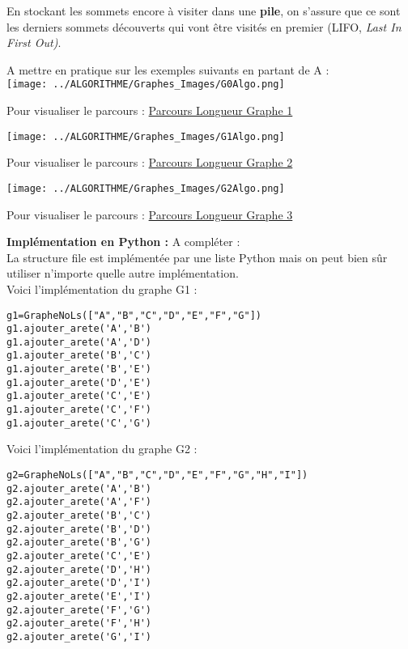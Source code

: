 \documentclass[12pt]{book}
\begin{document}
En stockant les sommets encore à visiter dans une \textbf{pile}, on s'assure que ce sont les derniers sommets découverts qui vont être visités en premier (LIFO, \emph{Last In First Out)}.


\Quest A mettre en pratique sur les exemples suivants en partant de A : \\



\texttt{[image: ../ALGORITHME/Graphes\_Images/G0Algo.png]} 

Pour visualiser le parcours : \href{http://graphonline.ru/fr/home?graph=lrKWNaYUXjRDAwGcZZcst}{Parcours Longueur Graphe 1}



\texttt{[image: ../ALGORITHME/Graphes\_Images/G1Algo.png]} 

Pour visualiser le parcours : \href{http://graphonline.ru/fr/home?graph=iDTFdMBwUVWDnJBhZZcst}{Parcours Longueur Graphe 2}

\texttt{[image: ../ALGORITHME/Graphes\_Images/G2Algo.png]} 

Pour visualiser le parcours : \href{http://graphonline.ru/fr/home?graph=ppLAPymkbRymvVrCZZcst}{Parcours Longueur Graphe 3}

\Quest \textbf{Implémentation en Python : } A compléter :\\
La structure file est implémentée par une liste Python mais on peut bien sûr utiliser n'importe quelle autre implémentation.\\

Voici l'implémentation du graphe G1 : 
\begin{lstlisting}
g1=GrapheNoLs(["A","B","C","D","E","F","G"])
g1.ajouter_arete('A','B')
g1.ajouter_arete('A','D')
g1.ajouter_arete('B','C')
g1.ajouter_arete('B','E')
g1.ajouter_arete('D','E')
g1.ajouter_arete('C','E')
g1.ajouter_arete('C','F')
g1.ajouter_arete('C','G')
\end{lstlisting}

Voici l'implémentation du graphe G2 : 
\begin{lstlisting}
g2=GrapheNoLs(["A","B","C","D","E","F","G","H","I"])
g2.ajouter_arete('A','B')
g2.ajouter_arete('A','F')
g2.ajouter_arete('B','C')
g2.ajouter_arete('B','D')
g2.ajouter_arete('B','G')
g2.ajouter_arete('C','E')
g2.ajouter_arete('D','H')
g2.ajouter_arete('D','I')
g2.ajouter_arete('E','I')
g2.ajouter_arete('F','G')
g2.ajouter_arete('F','H')
g2.ajouter_arete('G','I')
\end{lstlisting}
\end{document}
